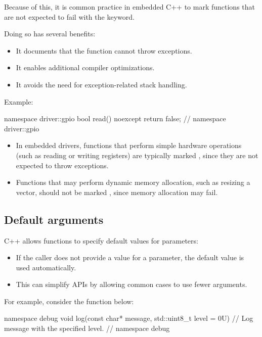 Because of this, it is common practice in embedded C++ to mark functions that are not expected to
fail with the  keyword.

Doing so has several benefits:
\begin{itemize}
  \item It documents that the function cannot throw exceptions.
  \item It enables additional compiler optimizations.
  \item It avoids the need for exception-related stack handling.
\end{itemize}
Example:

\begin{cppcode}
namespace driver::gpio
{
bool read() noexcept { return false; }
} // namespace driver::gpio
\end{cppcode}

\note[Important]
\begin{itemize}
  \item In embedded drivers, functions that perform simple hardware operations (such as reading or
    writing registers) are typically marked , since they are not expected to throw
    exceptions.
  \item Functions that may perform dynamic memory allocation, such as resizing a vector, should not
    be marked , since memory allocation may fail.
\end{itemize}

\subsection{Default arguments}
\label{c1:sec:defaultargs}
C++ allows functions to specify default values for parameters:
\begin{itemize}
  \item If the caller does not provide a value for a parameter, the default value is used
    automatically.
  \item This can simplify APIs by allowing common cases to use fewer arguments.
\end{itemize}
For example, consider the function  below:

\begin{cppcode}
namespace debug
{
void log(const char* message, std::uint8_t level = 0U)
{
    // Log message with the specified level.
}
} // namespace debug
\end{cppcode}


